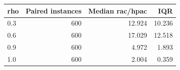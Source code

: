 \begin{tabular}{lrrr}
\toprule
rho & Paired instances & Median rac/hpac & IQR \\
\midrule
0.3 & 600 & 12.924 & 10.236 \\
0.6 & 600 & 17.029 & 12.518 \\
0.9 & 600 & 4.972 & 1.893 \\
1.0 & 600 & 2.004 & 0.359 \\
\bottomrule
\end{tabular}
